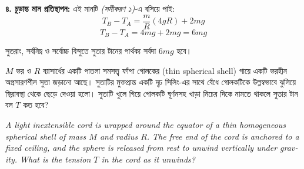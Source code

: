 \documentclass[12pt, a4paper]{article}
\begin{document}
{\begin{tcolorbox}[solutionbox={সমাধান (Solution)}]
\textbf{৪. চূড়ান্ত মান প্রতিস্থাপন:}
এই মানটি \textit{(সমীকরণ ১)}-এ বসিয়ে পাই:
$$T_B - T_A = \frac{m}{R} (4gR) + 2mg$$
$$T_B - T_A = 4mg + 2mg = 6mg$$

সুতরাং, সর্বনিম্ন ও সর্বোচ্চ বিন্দুতে সুতার টানের পার্থক্য সর্বদা $6mg$ হবে।
\end{tcolorbox}
\vspace{1em}

\begin{tcolorbox}[questionbox={প্রশ্ন (Question) 31}]
\noindent
$M$ ভর ও $R$ ব্যাসার্ধের একটি পাতলা সমসত্ত্ব ফাঁপা গোলকের (thin spherical shell) গায়ে একটি ভরহীন অপ্রসারণশীল সুতা জড়ানো আছে। সুতাটির মুক্তপ্রান্ত একটি দৃঢ় সিলিং-এর সাথে বেঁধে গোলকটিকে উল্লম্বভাবে ঝুলিয়ে স্থিরাবস্থা থেকে ছেড়ে দেওয়া হলো। সুতাটি খুলে গিয়ে গোলকটি ঘূর্ণনসহ খাড়া নিচের দিকে নামতে থাকলে সুতার টান বল $T$ কত হবে?

\vspace{0.8em}
\begin{english}
\noindent\textit{\color{darkgray}
A light inextensible cord is wrapped around the equator of a thin homogeneous spherical shell of mass $M$ and radius $R$. The free end of the cord is anchored to a fixed ceiling, and the sphere is released from rest to unwind vertically under gravity. What is the tension $T$ in the cord as it unwinds?
}
\end{english}
\end{tcolorbox}

\vspace{1em}
\begin{center}
\end{center}}
\end{document}
